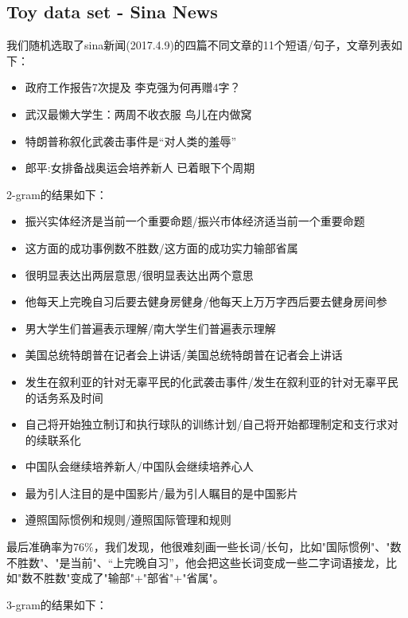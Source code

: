 \documentclass{article}
\begin{document}
\subsection{Toy data set - Sina News}

我们随机选取了sina新闻(2017.4.9)的四篇不同文章的11个短语/句子，文章列表如下：

\begin{itemize}
	\item 政府工作报告7次提及 李克强为何再赠4字？
	\item 武汉最懒大学生：两周不收衣服 鸟儿在内做窝
	\item 特朗普称叙化武袭击事件是“对人类的羞辱”
	\item 郎平:女排备战奥运会培养新人 已着眼下个周期
\end{itemize}

2-gram的结果如下：

\begin{itemize}
	\item 振兴实体经济是当前一个重要命题/振兴市体经济适当前一个重要命题
	\item 这方面的成功事例数不胜数/这方面的成功实力输部省属
	\item 很明显表达出两层意思/很明显表达出两个意思
	\item 他每天上完晚自习后要去健身房健身/他每天上万万字西后要去健身房间参
	\item 男大学生们普遍表示理解/南大学生们普遍表示理解
	\item 美国总统特朗普在记者会上讲话/美国总统特朗普在记者会上讲话
	\item 发生在叙利亚的针对无辜平民的化武袭击事件/发生在叙利亚的针对无辜平民的话务系及时间
	\item 自己将开始独立制订和执行球队的训练计划/自己将开始都理制定和支行求对的续联系化
	\item 中国队会继续培养新人/中国队会继续培养心人
	\item 最为引人注目的是中国影片/最为引人瞩目的是中国影片
	\item 遵照国际惯例和规则/遵照国际管理和规则
\end{itemize}

最后准确率为$76\%$，我们发现，他很难刻画一些长词/长句，比如"国际惯例"、"数不胜数"、"是当前"、“上完晚自习”，他会把这些长词变成一些二字词语接龙，比如"数不胜数"变成了"输部"+"部省"+"省属"。

3-gram的结果如下：
\end{document}

